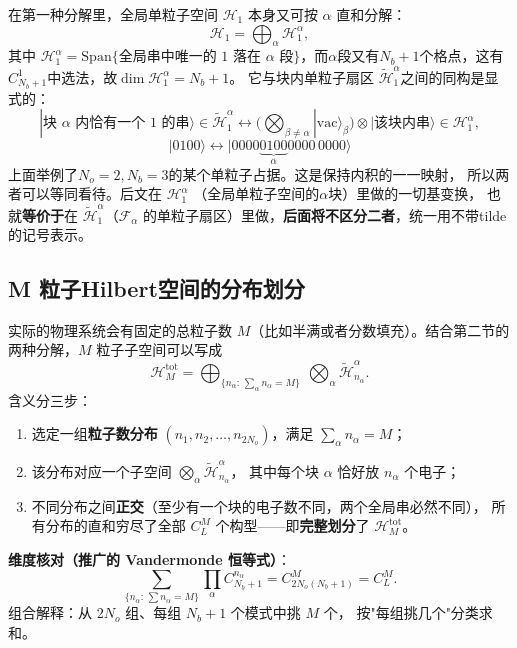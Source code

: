 \documentclass[11pt]{ctexart}
\begin{document}
在第一种分解里，全局单粒子空间 $\mathcal{H}_1$ 本身又可按 $\alpha$ 直和分解：
\[
\mathcal{H}_1=\bigoplus_\alpha\mathcal{H}_1^\alpha,
\]
其中 $\mathcal{H}_1^\alpha=\mathrm{Span}\{\text{全局串中唯一的 1 落在 }\alpha\text{ 段}\}$，而$\alpha$段又有$N_b+1$个格点，这有$C_{N_b+1}^1$中选法，故$\dim\mathcal{H}_1^\alpha=N_b+1$。
它与块内单粒子扇区 $\tilde{\mathcal{H}}_1^\alpha$之间的同构是显式的：
\[
|\text{块 } \alpha \text{ 内恰有一个 1 的串}\rangle \in \tilde{\mathcal{H}}_1^\alpha
\longleftrightarrow
\Big(\bigotimes_{\beta\neq\alpha}|\mathrm{vac}\rangle_\beta\Big)
\otimes |\text{该块内串}\rangle\in \mathcal{H}_1^\alpha,
\]
\[
|0100\rangle\longleftrightarrow|0000 \underbrace{0100}_\alpha 0000 \,0000\rangle
\]
上面举例了$N_o=2,N_b=3$的某个单粒子占据。这是保持内积的一一映射，
所以两者可以等同看待。后文在 $\mathcal{H}_1^\alpha$ （全局单粒子空间的$\alpha$块）里做的一切基变换，
也就\textbf{等价于}在 $\tilde{\mathcal{H}}_1^\alpha$（$\mathcal{F}_\alpha$ 的单粒子扇区）里做，\textbf{后面将不区分二者}，统一用不带tilde的记号表示。



\subsection{M 粒子Hilbert空间的分布划分}

实际的物理系统会有固定的总粒子数 $M$（比如半满或者分数填充）。结合第二节的两种分解，$M$ 粒子子空间可以写成
\[
\mathcal{H}_M^{\mathrm{tot}}
=
\bigoplus_{\{n_\alpha:\,\sum_\alpha n_\alpha=M\}}
\ \bigotimes_\alpha \tilde{\mathcal{H}}_{n_\alpha}^\alpha .
\]
含义分三步：

\begin{enumerate}
\item 选定一组\textbf{粒子数分布}
$(n_1,n_2,\dots,n_{2N_o})$，满足 $\sum_\alpha n_\alpha=M$；
\item 该分布对应一个子空间 $\bigotimes_\alpha\tilde{\mathcal{H}}_{n_\alpha}^\alpha$，
其中每个块 $\alpha$ 恰好放 $n_\alpha$ 个电子；
\item 不同分布之间\textbf{正交}（至少有一个块的电子数不同，两个全局串必然不同），
所有分布的直和穷尽了全部 $C_L^M$ 个构型——即\textbf{完整划分}了
$\mathcal{H}_M^{\mathrm{tot}}$。
\end{enumerate}

\textbf{维度核对（推广的 Vandermonde 恒等式）}：
\[
\sum_{\{n_\alpha:\,\sum n_\alpha=M\}}
\prod_\alpha C_{N_b+1}^{n_\alpha}
=
C_{2N_o(N_b+1)}^{M}
=
C_L^{M}.
\]
组合解释：从 $2N_o$ 组、每组 $N_b+1$ 个模式中挑 $M$ 个，
按"每组挑几个"分类求和。
\end{document}
